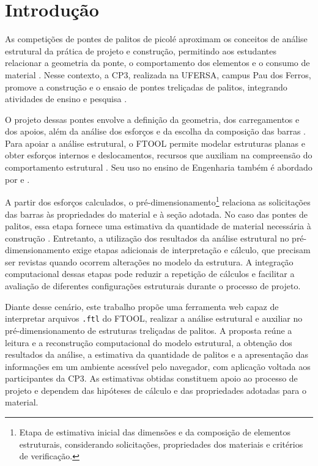\chapter{Introdução}
\label{cap:introducao}

As competições de pontes de palitos de picolé aproximam os conceitos de análise estrutural da prática de projeto e construção, permitindo aos estudantes relacionar a geometria da ponte, o comportamento dos elementos e o consumo de material \cite{lamberti2025ponte,silva2024metodologia}. Nesse contexto, a \gls{CP3}, realizada na \gls{UFERSA}, campus Pau dos Ferros, promove a construção e o ensaio de pontes treliçadas de palitos, integrando atividades de ensino e pesquisa \cite{silva2026ruptura}.

O projeto dessas pontes envolve a definição da geometria, dos carregamentos e dos apoios, além da análise dos esforços e da escolha da composição das barras \cite{silva2024metodologia}. Para apoiar a análise estrutural, o \gls{FTOOL} permite modelar estruturas planas e obter esforços internos e deslocamentos, recursos que auxiliam na compreensão do comportamento estrutural \cite{ftoolSobre}. Seu uso no ensino de Engenharia também é abordado por  e .

A partir dos esforços calculados, o pré-dimensionamento\footnote{Etapa de estimativa inicial das dimensões e da composição de elementos estruturais, considerando solicitações, propriedades dos materiais e critérios de verificação.} relaciona as solicitações das barras às propriedades do material e à seção adotada. No caso das pontes de palitos, essa etapa fornece uma estimativa da quantidade de material necessária à construção \cite{silva2024metodologia}. Entretanto, a utilização dos resultados da análise estrutural no pré-dimensionamento exige etapas adicionais de interpretação e cálculo, que precisam ser revistas quando ocorrem alterações no modelo da estrutura. A integração computacional dessas etapas pode reduzir a repetição de cálculos e facilitar a avaliação de diferentes configurações estruturais durante o processo de projeto.

Diante desse cenário, este trabalho propõe uma ferramenta web capaz de interpretar arquivos \texttt{.ftl} do \gls{FTOOL}, realizar a análise estrutural e auxiliar no pré-dimensionamento de estruturas treliçadas de palitos. A proposta reúne a leitura e a reconstrução computacional do modelo estrutural, a obtenção dos resultados da análise, a estimativa da quantidade de palitos e a apresentação das informações em um ambiente acessível pelo navegador, com aplicação voltada aos participantes da \gls{CP3}. As estimativas obtidas constituem apoio ao processo de projeto e dependem das hipóteses de cálculo e das propriedades adotadas para o material.


